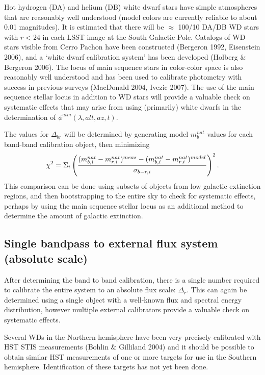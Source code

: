 \documentclass[12pt,preprint]{aastex}
\begin{document}
Hot hydrogen (DA) and helium (DB) white dwarf stars have simple
atmospheres that are reasonably well understood (model colors are
currently reliable to about 0.01 magnitudes). It is estimated that
there will be $\approx$ 100/10 DA/DB WD stars with $r<24$ in each LSST
image at the South Galactic Pole. Catalogs of WD stars visible from
Cerro Pachon have been constructed (Bergeron 1992, Eisenstein
2006), and a `white dwarf calibration system' has been developed
(Holberg \& Bergeron 2006). The locus of main sequence stars in
color-color space is also reasonably well understood and has been used
to calibrate photometry with success in previous surveys (MacDonald
2004, Ivezic 2007). The use of the main sequence stellar locus in addition to
WD stars will provide a valuable check on systematic effects that may
arise from using (primarily) white dwarfs in the determination of
$\phi^{atm}(\lambda,alt,az,t)$. 

The values for $\Delta_{br}$ will be determined by generating model
$m_b^{nat}$ values for each band-band calibration object, then
minimizing 
\begin{equation}
\chi^2 = \Sigma_{i} \left( { (m_{b,i}^{nat} - m_{r,i}^{nat})^{meas} - (m_{b,i}^{nat}
    - m_{r,i}^{nat})^{model} \over  \sigma_{b-r,i}}\right) ^2. 
\end{equation}
This comparison can
be done using subsets of objects from low galactic extinction regions,
and then bootstrapping to the entire sky to check for systematic
effects, perhaps by using the main sequence stellar locus as an
additional method to determine the amount of galactic extinction. 

\subsection{Single bandpass to external flux system (absolute scale)}

After determining the band to band calibration, there is a single
number required to calibrate the entire system to an absolute flux
scale: $\Delta_r$.  This can again be determined using a single
object with a well-known flux and spectral energy distribution,
however multiple external calibrators provide a valuable check on
systematic effects. 

Several WDs in the Northern hemisphere have been very precisely
calibrated with HST STIS measurements (Bohlin \& Gilliland 2004) and
it should be possible to obtain similar HST measurements of one or
more targets for use in the Southern hemisphere. Identification of
these targets has not yet been done. 
\end{document}

